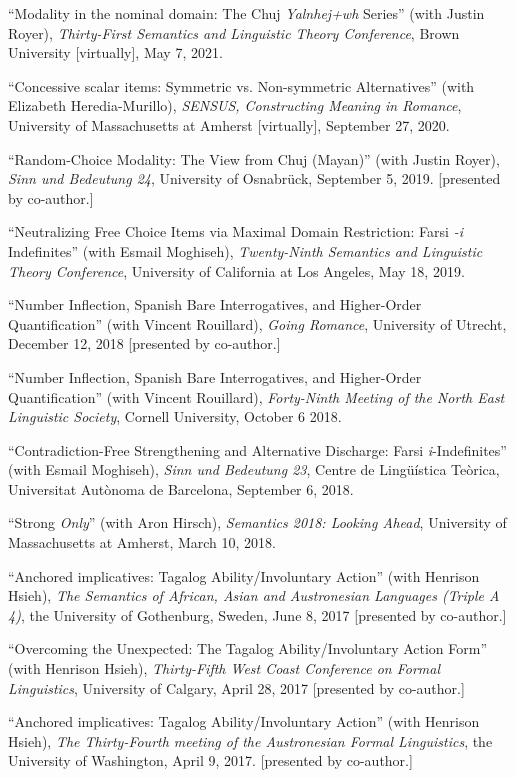 \documentclass[11pt]{article}
\begin{document}
``Modality in the nominal domain: The Chuj \textit{Yalnhej+wh} Series'' (with Justin Royer), \textit{Thirty-First Semantics and Linguistic Theory Conference}, Brown University [virtually], May 7, 2021.

``Concessive scalar items: Symmetric vs. Non-symmetric Alternatives'' (with Elizabeth Heredia-Murillo), \textit{SENSUS, Constructing Meaning in Romance}, University of Massachusetts at Amherst [virtually], September 27, 2020.

``Random-Choice Modality: The View from Chuj (Mayan)'' (with Justin Royer), \textit{Sinn und Bedeutung 24}, University of Osnabr\"{u}ck, September 5, 2019. [presented by co-author.]

``Neutralizing Free Choice Items via Maximal Domain Restriction: Farsi \textit{-i} Indefinites'' (with Esmail Moghiseh), \textit{Twenty-Ninth Semantics and Linguistic Theory Conference}, University of California at Los Angeles, May 18, 2019.

``Number Inflection, Spanish Bare Interrogatives, and Higher-Order Quantification'' (with Vincent Rouillard), \textit{Going Romance}, University of Utrecht, December 12, 2018 [presented by co-author.]

``Number Inflection, Spanish Bare Interrogatives, and Higher-Order Quantification'' (with Vincent Rouillard), \textit{Forty-Ninth
  Meeting of the North East Linguistic Society}, Cornell University, October 6 2018.

``Contradiction-Free Strengthening and Alternative Discharge: Farsi \textit{i}-Indefinites'' (with Esmail Moghiseh), \textit{Sinn und Bedeutung 23}, Centre de Ling\"{u}\'istica Te\`orica, Universitat Aut\`onoma de Barcelona, September 6, 2018.
 
``Strong \textit{Only}'' (with Aron Hirsch), \textit{Semantics 2018: Looking Ahead}, University of Massachusetts at Amherst, March 10, 2018.
 

``Anchored implicatives: Tagalog Ability/Involuntary Action'' (with Henrison Hsieh), \textit{The Semantics of African, Asian and Austronesian Languages (Triple A 4)}, the University of Gothenburg, Sweden, June 8, 2017 [presented by co-author.]

``Overcoming the Unexpected: The Tagalog Ability/Involuntary Action Form'' (with Henrison Hsieh),  \textit{Thirty-Fifth West Coast Conference on Formal Linguistics}, University of Calgary, April 28, 2017 [presented by co-author.]


``Anchored implicatives: Tagalog Ability/Involuntary Action'' (with Henrison Hsieh), \textit{The Thirty-Fourth meeting of the Austronesian Formal Linguistics}, the University of Washington, April 9, 2017. [presented by co-author.]
\end{document}

